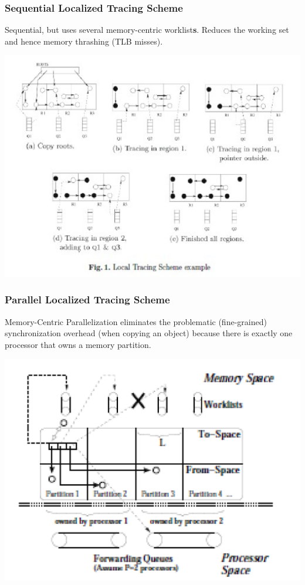 \documentclass{beamer}
\begin{document}
\begin{frame}[fragile,t]
  \frametitle{Sequential Localized Tracing Scheme}

Sequential, but uses several memory-centric worklist{\bf{}s}.
Reduces the working set and hence memory thrashing (TLB misses). 

\center\includegraphics[width=59ex]{ParTeaserFigs/LocalTracing}

\end{frame}


\begin{frame}[fragile,t]
  \frametitle{Parallel Localized Tracing Scheme}

Memory-Centric Parallelization eliminates the problematic
(fine-grained) synchronization overhead (when copying an object)
because there is exactly one processor that owns a memory
partition.   

\center\includegraphics[width=47ex]{ParTeaserFigs/ParTracing}

\end{frame}
\end{document}
